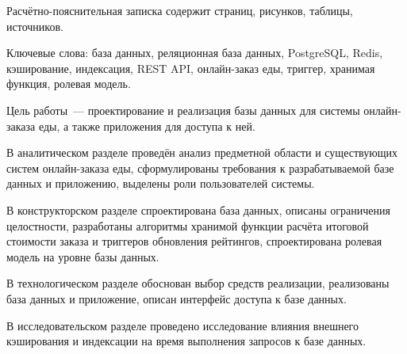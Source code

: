 Расчётно-пояснительная записка содержит \pageref{LastPage} страниц,  рисунков,  таблицы,  источников.

Ключевые слова: база данных, реляционная база данных, PostgreSQL,
Redis, кэширование, индексация, REST API, онлайн-заказ еды,
триггер, хранимая функция, ролевая модель.

Цель работы~--- проектирование и реализация базы данных для системы онлайн-заказа еды, а также приложения для доступа к ней.

В аналитическом разделе проведён анализ предметной области и
существующих систем онлайн-заказа еды, сформулированы требования
к разрабатываемой базе данных и приложению, выделены роли
пользователей системы.

В конструкторском разделе спроектирована база данных, описаны
ограничения целостности, разработаны алгоритмы хранимой функции
расчёта итоговой стоимости заказа и триггеров обновления рейтингов,
спроектирована ролевая модель на уровне базы данных.

В технологическом разделе обоснован выбор средств реализации,
реализованы база данных и приложение, описан интерфейс доступа
к базе данных.

В исследовательском разделе проведено исследование влияния
внешнего кэширования и индексации на время выполнения запросов
к базе данных.
